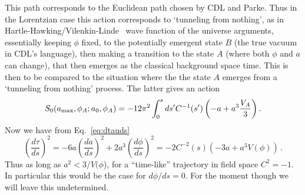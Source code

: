 \documentclass[a4paper,11pt]{article}
\numberwithin{equation}{section}
\begin{document}
This path corresponds to the Euclidean path chosen by CDL and Parke. Thus in the Lorentzian case this action corresponds to ‘tunneling from nothing’, as in Hartle-Hawking/Vilenkin-Linde~\cite{Vilenkin:1982de, Hartle:1983ai, Linde:1983mx} wave function of the universe arguments, essentially keeping $\phi$ fixed, to the potentially emergent state $B$ (the true vacuum in CDL's language), then making a transition to the state $A$ (where both $\phi$ and $a$ can change), that then emerges as the classical background space time. This is then to be compared to the situation where the the state $A$ emerges from a ‘tunneling from nothing’ process. The latter gives an action 
\begin{equation}
S_{0}(a_{{\rm max}},\phi_{A};a_{0},\phi_{A})=-12\pi^{2}\int_{0}^{s}ds'C^{-1}(s')\left(-a+a^{3}\frac{V_{A}}{3}\right).\label{eq:SA}
\end{equation}
Now we have from Eq.~\eqref{eq:dtauds} 
\begin{equation}
\left(\frac{d\tau}{ds}\right)^{2}=-6a\left(\frac{da}{ds}\right)^{2}+2a^{3}\left(\frac{d\phi}{ds}\right)^{2}=-2C^{-2}(s)(-3a+a^{3}V(\phi))\label{eq:dtauds-1} \,.
\end{equation}
Thus as long as $a^{2}<3/V(\phi$), for a ``time-like'' trajectory in field space $C^{2}=-1$. In particular this would be the case for $d\phi/ds=0$. For the moment though we will leave this undetermined. 
\end{document}
